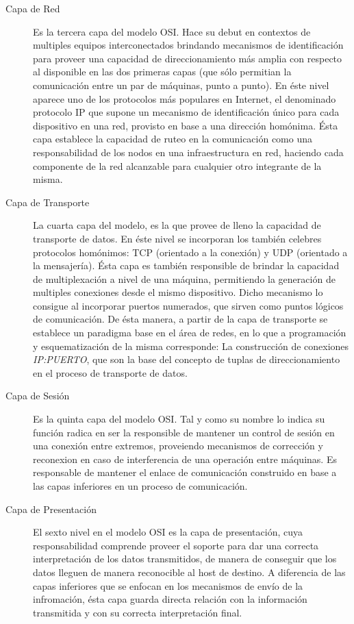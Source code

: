 \begin{intro}
\begin{description}
\item[Capa de Red] Es la tercera capa del modelo OSI. Hace su debut en contextos de multiples equipos interconectados brindando mecanismos de identificación para proveer una capacidad de direccionamiento más amplia con respecto al disponible en las dos primeras capas (que sólo permitian la comunicación entre un par de máquinas, punto a punto). En éste nivel aparece uno de los protocolos más populares en Internet, el denominado protocolo IP que supone un mecanismo de identificación único para cada dispositivo en una red, provisto en base a una dirección homónima. Ésta capa establece la capacidad de ruteo en la comunicación como una responsabilidad de los nodos en una infraestructura en red, haciendo cada componente de la red alcanzable para cualquier otro integrante de la misma.

\item[Capa de Transporte] La cuarta capa del modelo, es la que provee de lleno la capacidad de transporte de datos. En éste nivel se incorporan los también celebres protocolos homónimos: TCP (orientado a la conexión) y UDP (orientado a la mensajería). Ésta capa es también responsible de brindar la capacidad de multiplexación a nivel de una máquina, permitiendo la generación de multiples conexiones desde el mismo dispositivo. Dicho mecanismo lo consigue al incorporar puertos numerados, que sirven como puntos lógicos de comunicación. De ésta manera, a partir de la capa de transporte se establece un paradigma base en el área de redes, en lo que a programación y esquematización de la misma corresponde: La construcción de conexiones \emph{IP:PUERTO}, que son la base del concepto de tuplas de direccionamiento en el proceso de transporte de datos.

\item[Capa de Sesión] Es la quinta capa del modelo OSI. Tal y como su nombre lo indica su función radica en ser la responsible de mantener un control de sesión en una conexión entre extremos, proveiendo mecanismos de corrección y reconexion en caso de interferencia de una operación entre máquinas. Es responsable de mantener el enlace de comunicación construido en base a las capas inferiores en un proceso de comunicación.

\item[Capa de Presentación] El sexto nivel en el modelo OSI es la capa de presentación, cuya responsabilidad comprende proveer el soporte para dar una correcta interpretación de los datos transmitidos, de manera de conseguir que los datos lleguen de manera reconocible al host de destino. A diferencia de las capas inferiores que se enfocan en los mecanismos de envío de la infromación, ésta capa guarda directa relación con la información transmitida y con su correcta interpretación final.


\end{description}
\end{intro}
